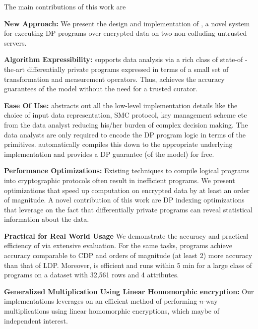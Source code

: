 The main contributions of this work are
\squishlist
\item \textbf{New Approach:} We present the design and implementation of \system, a novel system for executing DP programs over encrypted data on two non-colluding untrusted servers. %
\item \textbf{Algorithm Expressibility:} \system supports data analysis via a rich class of state-of -the-art differentially private programs expressed in terms of a small set of transformation and measurement operators. Thus, \system achieves the accuracy guarantees of the \cdp model without the need for a trusted curator.  
\item \textbf{Ease Of Use:} \system abstracts out all the low-level implementation details like the choice of input data representation, SMC protocol, key management scheme etc from the data analyst reducing his/her burden of complex decision making. The data analysts are only required to encode the DP program logic in terms of the \system primitives. \system automatically compiles this down to the appropriate underlying implementation and provides a DP guarantee (of the \cdp model) for free. 
\item \textbf{Performance Optimizations:} Existing techniques to compile logical \system programs into cryptographic protocols often result in inefficient programs. We present optimizations that speed up computation on encrypted data by at least an order of magnitude. A novel contribution of this work are DP indexing optimizations that leverage on the fact that differentially private programs can reveal statistical information about the data. 
\item \textbf{Practical for Real World Usage} We demonstrate the accuracy and practical efficiency of \system via extensive  evaluation. For the same tasks, \system programs achieve accuracy comparable to \textsf{CDP} and orders of magnitude (at least 2) more accuracy than that of \textsf{LDP}. Moreover, \system is efficient and runs within 5 min for a large class of programs on a dataset with 32,561 rows and 4 attributes. 
\item \textbf{Generalized Multiplication Using Linear Homomorphic encryption:} Our implementations leverages on an efficient method of performing $n$-way multiplications using linear homomorphic encryptions, which maybe of independent interest.
\squishend
